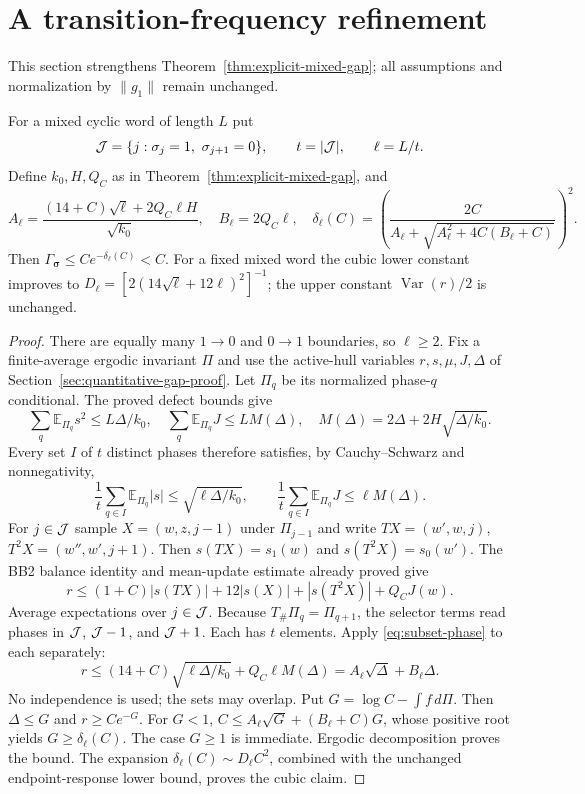\section{A transition-frequency refinement}\label{sec:transition-frequency}
This section strengthens Theorem~\ref{thm:explicit-mixed-gap}; all assumptions and normalization by $\|g_1\|$ remain unchanged.
\begin{theorem}\label{thm:density}
For a mixed cyclic word of length $L$ put
\[
 {\cal J}=\{j:\sigma_j=1,\ \sigma_{j+1}=0\},\qquad
 t=|{\cal J}|,\qquad \ell=L/t.
\]
Define $k_0,H,Q_C$ as in Theorem~\ref{thm:explicit-mixed-gap}, and
\[
 A_\ell=\frac{(14+C)\sqrt\ell+2Q_C\ell H}{\sqrt{k_0}},\quad
 B_\ell=2Q_C\ell,\quad
 \delta_\ell(C)=\left(\frac{2C}{A_\ell+
 \sqrt{A_\ell^2+4C(B_\ell+C)}}\right)^2.
\]
Then $\Gamma_{\bm\sigma}\le C e^{-\delta_\ell(C)}<C$. For a fixed mixed word the cubic lower constant improves to
$D_\ell=[2(14\sqrt\ell+12\ell)^2]^{-1}$; the upper constant $\operatorname{Var}(r)/2$ is unchanged.
\end{theorem}
\begin{proof}
There are equally many $1\to0$ and $0\to1$ boundaries, so $\ell\ge2$. Fix a finite-average ergodic invariant $\Pi$ and use the active-hull variables $r,s,\mu,J,\Delta$ of Section~\ref{sec:quantitative-gap-proof}. Let $\Pi_q$ be its normalized phase-$q$ conditional. The proved defect bounds give
\[
 \sum_q\mathbb E_{\Pi_q}s^2\le L\Delta/k_0,\quad
 \sum_q\mathbb E_{\Pi_q}J\le LM(\Delta),\quad
 M(\Delta)=2\Delta+2H\sqrt{\Delta/k_0}.
\]
Every set $I$ of $t$ distinct phases therefore satisfies, by Cauchy--Schwarz and nonnegativity,
\begin{equation}\label{eq:subset-phase}
 \frac1t\sum_{q\in I}\mathbb E_{\Pi_q}|s|\le\sqrt{\ell\Delta/k_0},
 \qquad \frac1t\sum_{q\in I}\mathbb E_{\Pi_q}J\le\ell M(\Delta).
\end{equation}
For $j\in{\cal J}$ sample $X=(w,z,j-1)$ under $\Pi_{j-1}$ and write $TX=(w',w,j)$, $T^2X=(w'',w',j+1)$. Then $s(TX)=s_1(w)$ and $s(T^2X)=s_0(w')$. The BB2 balance identity and mean-update estimate already proved give
\[
 r\le(1+C)|s(TX)|+12|s(X)|+|s(T^2X)|+Q_CJ(w).
\]
Average expectations over $j\in{\cal J}$. Because $T_\#\Pi_q=\Pi_{q+1}$, the selector terms read phases in $ {\cal J}$, $ {\cal J}-1$, and $ {\cal J}+1$. Each has $t$ elements. Apply \eqref{eq:subset-phase} to each separately:
\[
 r\le(14+C)\sqrt{\ell\Delta/k_0}+Q_C\ell M(\Delta)
 =A_\ell\sqrt\Delta+B_\ell\Delta.
\]
No independence is used; the sets may overlap. Put $G=\log C-\int f\,d\Pi$. Then $\Delta\le G$ and $r\ge Ce^{-G}$. For $G<1$,
$C\le A_\ell\sqrt G+(B_\ell+C)G$, whose positive root yields $G\ge\delta_\ell(C)$. The case $G\ge1$ is immediate. Ergodic decomposition proves the bound. The expansion $\delta_\ell(C)\sim D_\ell C^2$, combined with the unchanged endpoint-response lower bound, proves the cubic claim.
\end{proof}
